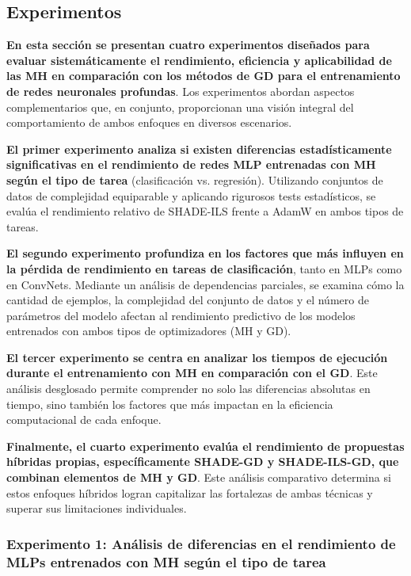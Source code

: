 \subsection{Experimentos}

\textbf{En esta sección se presentan cuatro experimentos diseñados para evaluar sistemáticamente el rendimiento, eficiencia y aplicabilidad de las MH en comparación con los métodos de GD para el entrenamiento de redes neuronales profundas}. Los experimentos abordan aspectos complementarios que, en conjunto, proporcionan una visión integral del comportamiento de ambos enfoques en diversos escenarios.

\textbf{El primer experimento analiza si existen diferencias estadísticamente significativas en el rendimiento de redes MLP entrenadas con MH según el tipo de tarea} (clasificación vs. regresión). Utilizando conjuntos de datos de complejidad equiparable y aplicando rigurosos tests estadísticos, se evalúa el rendimiento relativo de SHADE-ILS frente a AdamW en ambos tipos de tareas.

\textbf{El segundo experimento profundiza en los factores que más influyen en la pérdida de rendimiento en tareas de clasificación}, tanto en MLPs como en ConvNets. Mediante un análisis de dependencias parciales, se examina cómo la cantidad de ejemplos, la complejidad del conjunto de datos y el número de parámetros del modelo afectan al rendimiento predictivo de los modelos entrenados con ambos tipos de optimizadores (MH y GD).

\textbf{El tercer experimento se centra en analizar los tiempos de ejecución durante el entrenamiento con MH en comparación con el GD}. Este análisis desglosado permite comprender no solo las diferencias absolutas en tiempo, sino también los factores que más impactan en la eficiencia computacional de cada enfoque.

\textbf{Finalmente, el cuarto experimento evalúa el rendimiento de propuestas híbridas propias, específicamente SHADE-GD y SHADE-ILS-GD, que combinan elementos de MH y GD}. Este análisis comparativo determina si estos enfoques híbridos logran capitalizar las fortalezas de ambas técnicas y superar sus limitaciones individuales.




\subsubsection{Experimento 1: Análisis de diferencias en el rendimiento de MLPs entrenados con MH según el tipo de tarea}


